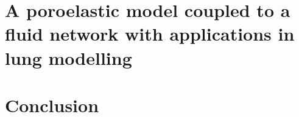 \documentclass[letterpaper,12pt]{report}
\newenvironment{abstractchap}{\rightskip1in\itshape}{}
\begin{document}
\chapter{A poroelastic model coupled to a fluid network with applications
in lung modelling}
%

% 

%
%
%



%








\chapter{Conclusion}






\appendix
\chapter{}

%




\end{document}
